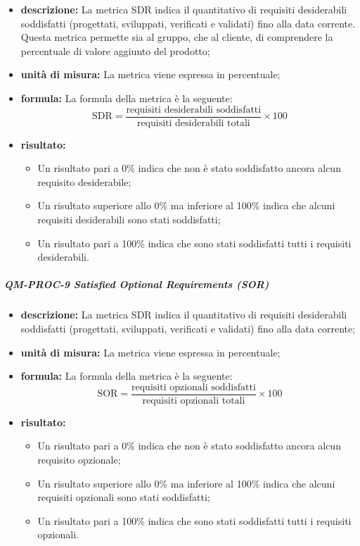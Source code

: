 			\begin{itemize}
      			\item \textbf{descrizione: }
				La metrica SDR indica il quantitativo di requisiti desiderabili soddisfatti (progettati, sviluppati, verificati e validati) fino alla data corrente. Questa metrica permette sia al gruppo, che al cliente, di comprendere la percentuale di valore aggiunto del prodotto;

				\item \textbf{unità di misura: }
				La metrica viene espressa in percentuale;

				\item \textbf{formula: }
				La formula della metrica è la seguente:
				\[
					\text{SDR} = \frac{\text{requisiti desiderabili soddisfatti}}{\text{requisiti desiderabili totali}} \times 100
				\]

				\item \textbf{risultato: }
				\begin{itemize}
					\item Un risultato pari a 0\% indica che non è stato soddisfatto ancora alcun requisito desiderabile;
					\item Un risultato superiore allo 0\% ma inferiore al 100\% indica che alcuni requisiti desiderabili sono stati soddisfatti;
					\item Un risultato pari a 100\% indica che sono stati soddisfatti tutti i requisiti desiderabili.
				\end{itemize}
			\end{itemize}

			\subparagraph{QM-PROC-9 Satisfied Optional Requirements (SOR)}

			\begin{itemize}
      			\item \textbf{descrizione: }
				La metrica SDR indica il quantitativo di requisiti desiderabili soddisfatti (progettati, sviluppati, verificati e validati) fino alla data corrente;

				\item \textbf{unità di misura: }
				La metrica viene espressa in percentuale;

				\item \textbf{formula: }
				La formula della metrica è la seguente:
				\[
					\text{SOR} = \frac{\text{requisiti opzionali soddisfatti}}{\text{requisiti opzionali totali}} \times 100
				\]

				\item \textbf{risultato: }
				\begin{itemize}
					\item Un risultato pari a 0\% indica che non è stato soddisfatto ancora alcun requisito opzionale;
					\item Un risultato superiore allo 0\% ma inferiore al 100\% indica che alcuni requisiti opzionali sono stati soddisfatti;
					\item Un risultato pari a 100\% indica che sono stati soddisfatti tutti i requisiti opzionali.
				\end{itemize}
			\end{itemize}


